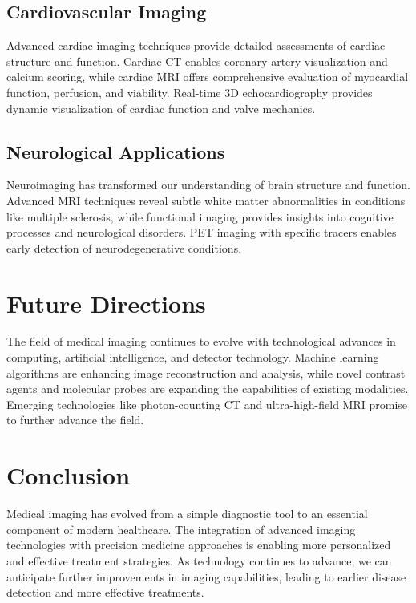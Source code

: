 \documentclass[12pt]{article}
\begin{document}
\subsection{Cardiovascular Imaging}
Advanced cardiac imaging techniques provide detailed assessments of cardiac structure and function. Cardiac CT enables coronary artery visualization and calcium scoring, while cardiac MRI offers comprehensive evaluation of myocardial function, perfusion, and viability. Real-time 3D echocardiography provides dynamic visualization of cardiac function and valve mechanics.

\subsection{Neurological Applications}
Neuroimaging has transformed our understanding of brain structure and function. Advanced MRI techniques reveal subtle white matter abnormalities in conditions like multiple sclerosis, while functional imaging provides insights into cognitive processes and neurological disorders. PET imaging with specific tracers enables early detection of neurodegenerative conditions.

\section{Future Directions}
The field of medical imaging continues to evolve with technological advances in computing, artificial intelligence, and detector technology. Machine learning algorithms are enhancing image reconstruction and analysis, while novel contrast agents and molecular probes are expanding the capabilities of existing modalities. Emerging technologies like photon-counting CT and ultra-high-field MRI promise to further advance the field.

\section{Conclusion}
Medical imaging has evolved from a simple diagnostic tool to an essential component of modern healthcare. The integration of advanced imaging technologies with precision medicine approaches is enabling more personalized and effective treatment strategies. As technology continues to advance, we can anticipate further improvements in imaging capabilities, leading to earlier disease detection and more effective treatments.


\end{document}
